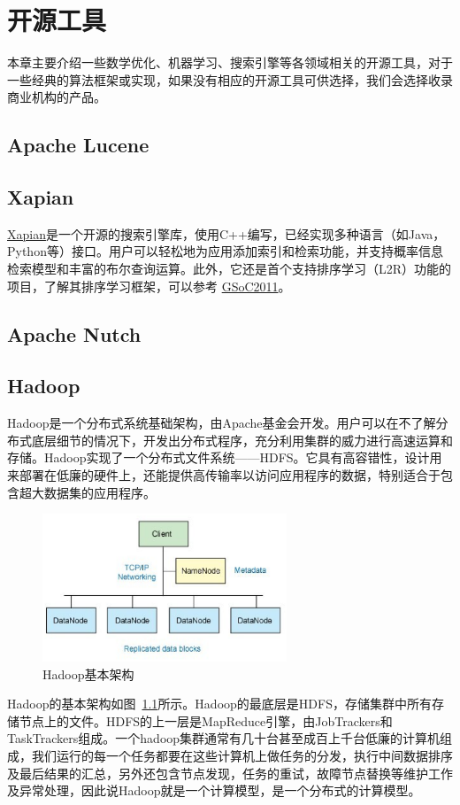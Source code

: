 \chapter{开源工具}
本章主要介绍一些数学优化、机器学习、搜索引擎等各领域相关的开源工具，对于一些经典的算法框架或实现，如果没有相应的开源工具可供选择，我们会选择收录商业机构的产品。
\section{Apache Lucene}
\section{Xapian}
\href{http://xapian.org/}{Xapian}是一个开源的搜索引擎库，使用C++编写，已经实现多种语言（如Java，Python等）接口。用户可以轻松地为应用添加索引和检索功能，并支持概率信息检索模型和丰富的布尔查询运算。此外，它还是首个支持排序学习（L2R）功能的项目，了解其排序学习框架，可以参考
\href{http://trac.xapian.org/wiki/GSoC2011/LTR/LTRFramework}{GSoC2011}。

\section{Apache Nutch}

\section{Hadoop}
Hadoop是一个分布式系统基础架构，由Apache基金会开发。用户可以在不了解分布式底层细节的情况下，开发出分布式程序，充分利用集群的威力进行高速运算和存储。Hadoop实现了一个分布式文件系统——HDFS。它具有高容错性，设计用来部署在低廉的硬件上，还能提供高传输率以访问应用程序的数据，特别适合于包含超大数据集的应用程序。
\begin{figure}[htbp]
  \centering
  \includegraphics[width=0.65\textwidth]{figures/Hadoop.eps}
  \caption{Hadoop基本架构}\label{fig:hadoop}
\end{figure}

Hadoop的基本架构如图~\ref{fig:hadoop}所示。Hadoop的最底层是HDFS，存储集群中所有存储节点上的文件。HDFS的上一层是MapReduce引擎，由JobTrackers和TaskTrackers组成。一个hadoop集群通常有几十台甚至成百上千台低廉的计算机组成，我们运行的每一个任务都要在这些计算机上做任务的分发，执行中间数据排序及最后结果的汇总，另外还包含节点发现，任务的重试，故障节点替换等维护工作及异常处理，因此说Hadoop就是一个计算模型，是一个分布式的计算模型。

